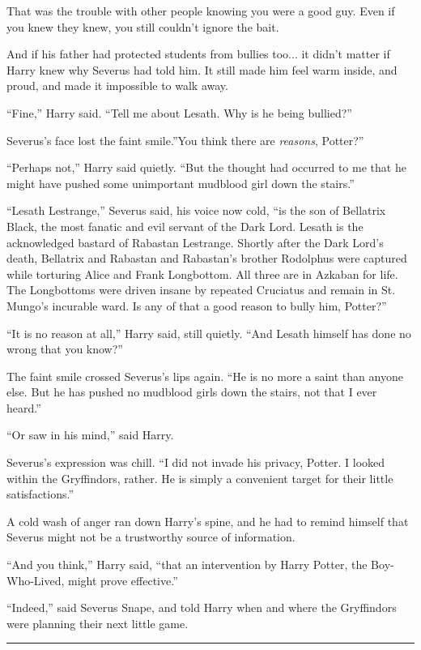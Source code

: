 That was the trouble with other people knowing you were a good guy. Even
if you knew they knew, you still couldn't ignore the bait.

And if his father had protected students from bullies too... it
didn't matter if Harry knew why Severus had told him. It still made him
feel warm inside, and proud, and made it impossible to walk away.

``Fine,'' Harry said. ``Tell me about Lesath. Why is he being bullied?''

Severus's face lost the faint smile.''You think there are
\emph{reasons}, Potter?''

``Perhaps not,'' Harry said quietly. ``But the thought had occurred to
me that he might have pushed some unimportant mudblood girl down the
stairs.''

``Lesath Lestrange,'' Severus said, his voice now cold, ``is the son of
Bellatrix Black, the most fanatic and evil servant of the Dark Lord.
Lesath is the acknowledged bastard of Rabastan Lestrange. Shortly after
the Dark Lord's death, Bellatrix and Rabastan and Rabastan's brother
Rodolphus were captured while torturing Alice and Frank Longbottom. All
three are in Azkaban for life. The Longbottoms were driven insane by
repeated Cruciatus and remain in St. Mungo's incurable ward. Is any of
that a good reason to bully him, Potter?''

``It is no reason at all,'' Harry said, still quietly. ``And Lesath
himself has done no wrong that you know?''

The faint smile crossed Severus's lips again. ``He is no more a saint
than anyone else. But he has pushed no mudblood girls down the stairs,
not that I ever heard.''

``Or saw in his mind,'' said Harry.

Severus's expression was chill. ``I did not invade his privacy, Potter.
I looked within the Gryffindors, rather. He is simply a convenient
target for their little satisfactions.''

A cold wash of anger ran down Harry's spine, and he had to remind
himself that Severus might not be a trustworthy source of information.

``And you think,'' Harry said, ``that an intervention by Harry Potter,
the Boy-Who-Lived, might prove effective.''

``Indeed,'' said Severus Snape, and told Harry when and where the
Gryffindors were planning their next little game.

\begin{center}\rule{3in}{0.4pt}\end{center}


